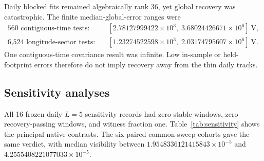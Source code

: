 \documentclass[11pt]{article}
\begin{document}
\begin{table}[ht]
\centering
\caption{Shared-parameter blocked recovery.  Ranges span all splits of the
named type; global and test quantities are median/P90 error in V.}
\label{tab:blocked}
\end{table}

Daily blocked fits remained algebraically rank 36, yet global recovery was
catastrophic.  The finite median-global-error ranges were
\begin{align*}
\text{560 contiguous-time tests:}\quad
 &[2.78127999422\times10^3,\;3.68024426671\times10^6]\ \mathrm{V},\\
\text{6,524 longitude-sector tests:}\quad
 &[1.23274522598\times10^3,\;2.03174795607\times10^6]\ \mathrm{V}.
\end{align*}
One contiguous-time covariance result was infinite.  Low in-sample or held-
footprint errors therefore do not imply recovery away from the thin daily
tracks.

\subsection{Sensitivity analyses}

All 16 frozen daily $L=5$ sensitivity records had zero stable windows, zero
recovery-passing windows, and witness fraction one.  Table~\ref{tab:sensitivity}
shows the principal native contrasts.  The six paired common-sweep cohorts
gave the same verdict, with median visibility between
$1.9548336121415843\times10^{-5}$ and
$4.2555408221077033\times10^{-5}$.
\end{document}
